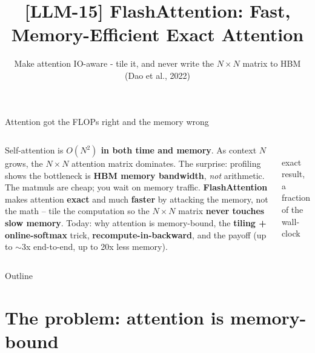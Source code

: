 \documentclass[aspectratio=169]{beamer}
\title{[LLM-15] FlashAttention: Fast, Memory-Efficient Exact Attention}
\subtitle{Make attention IO-aware - tile it, and never write the $N\times N$ matrix to HBM \quad(Dao et al., 2022)}
\date{}
\begin{document}
\begin{frame}{Attention got the FLOPs right and the memory wrong}
  \begin{columns}[T]
    Self-attention is \textbf{$O(N^2)$ in both time and memory}. As context $N$ grows,
    the $N\times N$ attention matrix dominates.
    \vskip 6pt
    The surprise: profiling shows the bottleneck is \textbf{HBM memory bandwidth},
    \emph{not} arithmetic. The matmuls are cheap; you wait on memory traffic.
    \vskip 6pt
    \textbf{FlashAttention} makes attention \textbf{exact} and much \textbf{faster} by
    attacking the memory, not the math -- tile the computation so the $N\times N$ matrix
    \textbf{never touches slow memory}.
    \vskip 6pt
    Today: why attention is memory-bound, the \textbf{tiling + online-softmax} trick,
    \textbf{recompute-in-backward}, and the payoff (up to $\sim$3x end-to-end, up to 20x
    less memory).
    \begin{center}
      \\[4pt]
      {\scriptsize exact result, a fraction of the wall-clock}
    \end{center}
  \end{columns}
\end{frame}

\begin{frame}{Outline}
  \tableofcontents
\end{frame}

\section{The problem: attention is memory-bound}
\end{document}
